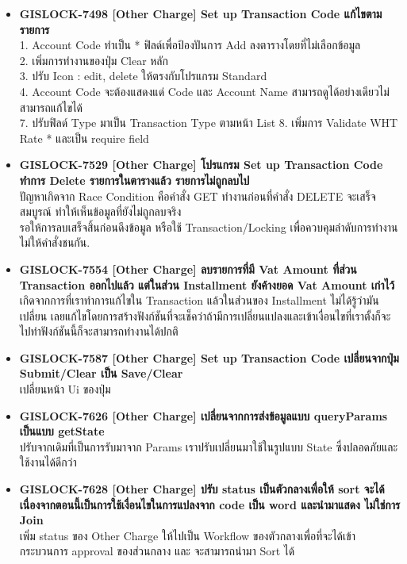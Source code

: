 \begin{itemize}
    \item \textbf{{GISLOCK-7498 [Other Charge] Set up Transaction Code แก้ไขตามรายการ}} \\
        1. Account Code ทำเป็น * ฟิลด์เพื่อป้องปันการ Add ลงตารางโดยที่ไม่เลือกข้อมูล \\
        2. เพิ่มการทำงานของปุ่ม Clear หลัก \\
        3. ปรับ Icon : edit, delete ให้ตรงกับโปรแกรม Standard \\
        4. Account Code จะต้องแสดงแด่ Code และ Account Name สามารถดูได้อย่างเดียวไม่สามารถแก้ไขได้ \\
        7. ปรับฟิลด์ Type มาเป็น Transaction Type ตามหน้า List
        8. เพิ่มการ Validate WHT Rate * และเป็น require field
    \item \textbf{{GISLOCK-7529 [Other Charge] โปรแกรม Set up Transaction Code ทำการ Delete รายการในตารางแล้ว รายการไม่ถูกลบไป}} \\
        ปัญหาเกิดจาก Race Condition คือคำสั่ง GET ทำงานก่อนที่คำสั่ง DELETE จะเสร็จสมบูรณ์ ทำให้เห็นข้อมูลที่ยังไม่ถูกลบจริง \\
        รอให้การลบเสร็จสิ้นก่อนดึงข้อมูล หรือใช้ Transaction/Locking เพื่อควบคุมลำดับการทำงานไม่ให้คำสั่งชนกัน.
    \item \textbf{{GISLOCK-7554 [Other Charge] ลบรายการที่มี Vat Amount ที่ส่วน Transaction ออกไปแล้ว แต่ในส่วน Installment ยังค้างยอด Vat Amount เก่าไว้}} \\
        เกิดจากการที่เราทำการแก้ไขใน Transaction แล้วในส่วนของ Installment ไม่ได้รู้ว่ามันเปลี่ยน เลยแก้ไขโดยการสร้างฟังก์ชันที่จะเช็คว่าถ้ามีการเปลี่ยนแปลงและเข้าเงื่อนไขที่เราตั้งก็จะไปทำฟังก์ชันนี้ก็จะสามารถทำงานได้ปกติ
    \item \textbf{{GISLOCK-7587 [Other Charge] Set up Transaction Code เปลี่ยนจากปุ่ม Submit/Clear เป็น Save/Clear}} \\
        เปลี่ยนหน้า Ui ของปุ่ม
    \item \textbf{{GISLOCK-7626 [Other Charge] เปลี่ยนจากการส่งข้อมูลแบบ queryParams เป็นแบบ getState}} \\
        ปรับจากเดิมที่เป็นการรับมาจาก Params เราปรับเปลี่ยนมาใช้ในรูปแบบ State ซึ่งปลอดภัยและใช้งานได้ดีกว่า
    \item \textbf{{GISLOCK-7628 [Other Charge] ปรับ status เป็นตัวกลางเพื่อให้ sort จะได้ เนื่องจากตอนนี้เป็นการใช้เงื่อนไขในการแปลงจาก code เป็น word และนำมาแสดง ไม่ใช่การ Join}} \\
        เพิ่ม status ของ Other Charge ให้ไปเป็น Workflow ของตัวกลางเพื่อที่จะได้เข้ากระบวนการ approval ของส่วนกลาง และ จะสามารถนำมา Sort ได้

\end{itemize}
